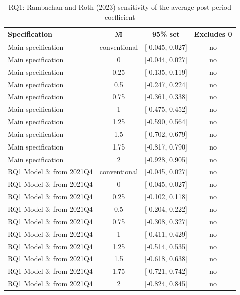 \begin{table}[htbp]\centering
\caption{RQ1: Rambachan and Roth (2023) sensitivity of the average post-period coefficient}
\begin{tabular}{lccc}
\toprule
Specification & M̄ & 95\% set & Excludes 0 \\
\midrule
Main specification & conventional & [-0.045, 0.027] & no \\
Main specification & 0 & [-0.044, 0.027] & no \\
Main specification & 0.25 & [-0.135, 0.119] & no \\
Main specification & 0.5 & [-0.247, 0.224] & no \\
Main specification & 0.75 & [-0.361, 0.338] & no \\
Main specification & 1 & [-0.475, 0.452] & no \\
Main specification & 1.25 & [-0.590, 0.564] & no \\
Main specification & 1.5 & [-0.702, 0.679] & no \\
Main specification & 1.75 & [-0.817, 0.790] & no \\
Main specification & 2 & [-0.928, 0.905] & no \\
RQ1 Model 3: from 2021Q4 & conventional & [-0.045, 0.027] & no \\
RQ1 Model 3: from 2021Q4 & 0 & [-0.045, 0.027] & no \\
RQ1 Model 3: from 2021Q4 & 0.25 & [-0.102, 0.118] & no \\
RQ1 Model 3: from 2021Q4 & 0.5 & [-0.204, 0.222] & no \\
RQ1 Model 3: from 2021Q4 & 0.75 & [-0.308, 0.327] & no \\
RQ1 Model 3: from 2021Q4 & 1 & [-0.411, 0.429] & no \\
RQ1 Model 3: from 2021Q4 & 1.25 & [-0.514, 0.535] & no \\
RQ1 Model 3: from 2021Q4 & 1.5 & [-0.618, 0.638] & no \\
RQ1 Model 3: from 2021Q4 & 1.75 & [-0.721, 0.742] & no \\
RQ1 Model 3: from 2021Q4 & 2 & [-0.824, 0.845] & no \\
\bottomrule
\end{tabular}
\par\vspace{2pt}{\footnotesize Relative-magnitudes restriction: each post-period violation of parallel trends is at most M̄ times the largest pre-period one. Robust sets from the HonestDiD R package (step 08); the breakdown M̄ is the largest M̄ at which zero is excluded.}
\end{table}
